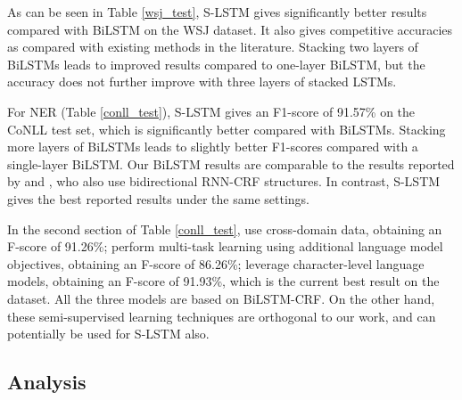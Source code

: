 \documentclass[11pt,a4paper]{article}
\begin{document}
As can be seen in Table \ref{wsj_test}, S-LSTM gives significantly better results compared with BiLSTM on the WSJ dataset. 
It also gives competitive accuracies as compared with existing methods in the literature. 
Stacking two layers of BiLSTMs leads to improved results compared to one-layer BiLSTM, but the accuracy does not further improve with three layers of stacked LSTMs. 


For NER (Table \ref{conll_test}), S-LSTM gives an F1-score of 91.57\% on the CoNLL test set, which is significantly better compared with BiLSTMs.
Stacking more layers of BiLSTMs leads to slightly better F1-scores compared with a single-layer BiLSTM.
Our BiLSTM results are comparable to the results reported by  and , who also use bidirectional RNN-CRF structures.
In contrast, S-LSTM gives the best reported results under the same settings.


In the second section of Table \ref{conll_test},  use cross-domain data, obtaining an F-score of 91.26\%;  perform multi-task learning using additional language model objectives, obtaining an F-score of 86.26\%;  leverage character-level language models, obtaining an F-score of 91.93\%, which is the current best result on the dataset. 
All the three models are based on BiLSTM-CRF. 
On the other hand, these semi-supervised learning techniques are orthogonal to our work, and can potentially be used for S-LSTM also.


\subsection{Analysis}
\label{sec:analysis}
\end{document}
